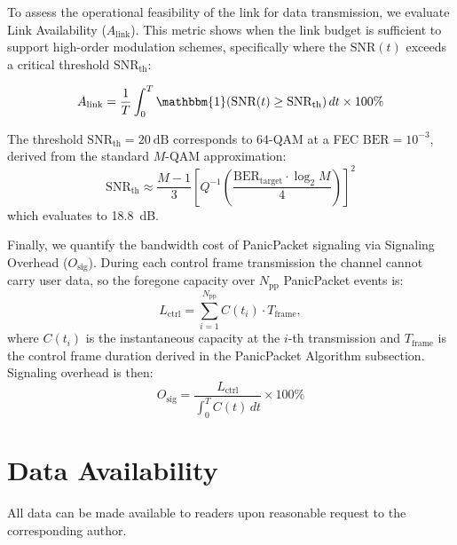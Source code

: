 \documentclass[fleqn,10pt]{wlscirep}
\begin{document}
To assess the operational feasibility of the link for data transmission, we evaluate Link Availability ($A_{\text{link}}$). This metric shows when the link budget is sufficient to support high-order modulation schemes, specifically where the $\text{SNR}(t)$ exceeds a critical threshold $\text{SNR}_{\text{th}}$:

\begin{equation}
    A_{\text{link}} = \frac{1}{T} \int_{0}^{T} \mathbbm{1}\!\left(\text{SNR}(t) \geq \text{SNR}_{\text{th}}\right) dt \times 100\%
\end{equation}

The threshold $\text{SNR}_{\text{th}} = \SI{20}{\deci\bel}$ corresponds to 64-QAM at a FEC $\text{BER} = 10^{-3}$, derived from the standard $M$-QAM approximation:
\begin{equation}
    \text{SNR}_{\text{th}} \approx \frac{M-1}{3} \left[ Q^{-1} \left( \frac{\text{BER}_{\text{target}} \cdot \log_2 M}{4} \right) \right]^2
\end{equation}
which evaluates to \SI{18.8}{\deci\bel}.

Finally, we quantify the bandwidth cost of PanicPacket signaling via Signaling Overhead ($O_{\text{sig}}$). During each control frame transmission the channel cannot carry user data, so the foregone capacity over $N_{\text{pp}}$ PanicPacket events is:
\begin{equation}
    L_{\text{ctrl}} = \sum_{i=1}^{N_{\text{pp}}} C(t_i) \cdot T_{\text{frame}},
\end{equation}
where $C(t_i)$ is the instantaneous capacity at the $i$-th transmission and $T_{\text{frame}}$ is the control frame duration derived in the PanicPacket Algorithm subsection. Signaling overhead is then:
\begin{equation}
    O_{\text{sig}} = \frac{L_{\text{ctrl}}}{\int_{0}^{T} C(t) \, dt} \times 100\%
\end{equation}


\section*{Data Availability}
All data can be made available to readers upon reasonable request to the corresponding author. 




\end{document}
